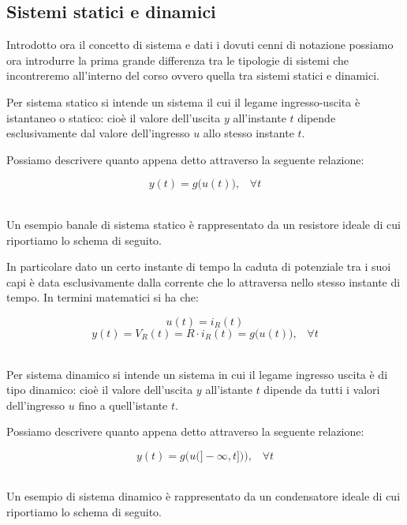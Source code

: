 \documentclass[../main.tex]{subfiles}
\begin{document}
\subsection{Sistemi statici e dinamici}

Introdotto ora il concetto di sistema e dati i dovuti cenni di notazione possiamo ora introdurre la prima grande differenza tra le tipologie di sistemi che incontreremo all'interno del corso ovvero quella tra sistemi statici e dinamici.

\begin{definition}
\end{definition}

Per sistema statico si intende un sistema il cui il legame ingresso-uscita è istantaneo o statico: cioè il valore dell'uscita $y$ all'instante $t$ dipende esclusivamente dal valore dell'ingresso $u$ allo stesso instante $t$.

Possiamo descrivere quanto appena detto attraverso la seguente relazione:

\[y(t) = g\big(u(t)\big), \hspace{10pt} \forall t \]\

Un esempio banale di sistema statico è rappresentato da un resistore ideale di cui riportiamo lo schema di seguito.



In particolare dato un certo instante di tempo la caduta di potenziale tra i suoi capi è data esclusivamente dalla corrente che lo attraversa nello stesso instante di tempo.
In termini matematici si ha che:

\[u(t) = i_R(t)\]
\[y(t) = V_R(t) = R \cdot i_R(t) =  g\big(u(t)\big), \hspace{10pt} \forall t \]\


\begin{definition}
\end{definition}	

Per sistema dinamico si intende un sistema in cui il legame ingresso uscita è di tipo dinamico: cioè il valore dell'uscita $y$ all'istante $t$ dipende da tutti i valori dell'ingresso $u$ fino a quell'istante $t$.

Possiamo descrivere quanto appena detto attraverso la seguente relazione:

\[y(t) = g\big( u\big( ] -\infty, t]\big) \big), \hspace{10pt} \forall t \]\ 

Un esempio di sistema dinamico è rappresentato da un condensatore ideale di cui riportiamo lo schema di seguito.
\end{document}
